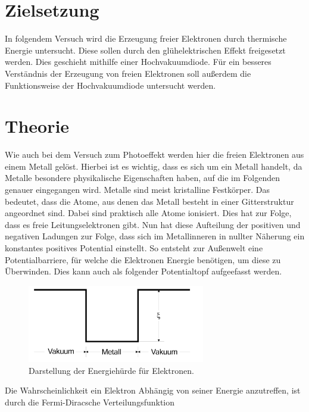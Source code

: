


\section{Zielsetzung}
\label{sec:Theorie}

In folgendem Versuch wird die Erzeugung freier Elektronen durch thermische Energie untersucht. Diese sollen durch den 
glühelektrischen Effekt freigesetzt werden. Dies geschieht mithilfe einer Hochvakuumdiode. Für ein besseres Verständnis 
der Erzeugung von freien Elektronen soll außerdem die Funktionsweise der Hochvakuumdiode untersucht werden. 

\section{Theorie}

Wie auch bei dem Versuch zum Photoeffekt werden hier die freien Elektronen aus einem Metall gelöst. Hierbei ist es 
wichtig, dass es sich um ein Metall handelt, da Metalle besondere physikalische Eigenschaften haben, auf die im 
Folgenden genauer eingegangen wird. Metalle sind meist kristalline Festkörper. Das bedeutet, dass die Atome, aus denen 
das Metall besteht in einer Gitterstruktur angeordnet sind. Dabei sind praktisch alle Atome ionisiert. Dies hat zur Folge, 
dass es freie Leitungselektronen gibt. Nun hat diese Aufteilung der positiven und negativen Ladungen zur Folge, dass sich 
im Metallinneren in nullter Näherung ein konstantes positives Potential einstellt. So entsteht zur Außenwelt eine 
Potentialbarriere, für welche die Elektronen Energie benötigen, um diese zu Überwinden. Dies kann auch als folgender 
Potentialtopf aufgeefasst werden.

\begin{figure}
    \centering
    \includegraphics[width=0.69\textwidth]{Potentialtopf.png}
    \caption{Darstellung der Energiehürde für Elektronen.}
\end{figure}

\noindent Die Wahrscheinlichkeit ein Elektron Abhängig von seiner Energie anzutreffen, ist durch die Fermi-Diracsche 
Verteilungsfunktion 

